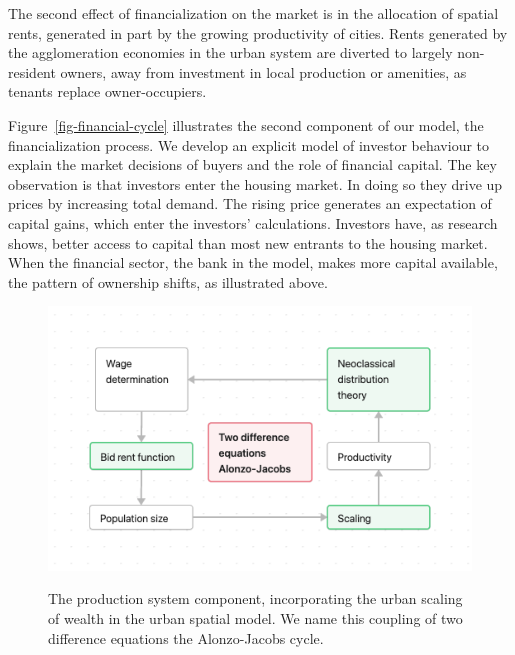 The second effect of financialization on the market is in the allocation of spatial rents, generated in part by the growing productivity of cities. Rents generated by the \gls{agglomeration} economies in the urban system are diverted to largely non-resident owners, away from investment in local production or amenities, as tenants replace owner-occupiers. %

Figure~\ref{fig-financial-cycle} illustrates the second component of our model, the financialization process. We develop an explicit model of investor behaviour to explain the market decisions of buyers and the role of financial capital. The key observation is that investors enter the housing market. In doing so they drive up prices by increasing total demand. The rising price generates an expectation of capital gains, which enter the investors' calculations. Investors have, as research shows, better access to capital than most new entrants to the housing market. When the financial sector, the bank in the model, makes more capital available, the pattern of ownership shifts, as illustrated above. %

\begin{figure}[!ht]
    \centering
    \includegraphics[scale=.7]{fig/flow_alonzo-jacobs_cycle.png}
    \label{fig-alonzo-jacobs-cycle}
\caption[Production system.]{The production system component, incorporating the urban scaling of wealth in the urban spatial model. We name this coupling of two difference equations the Alonzo-Jacobs cycle.}
\end{figure}

